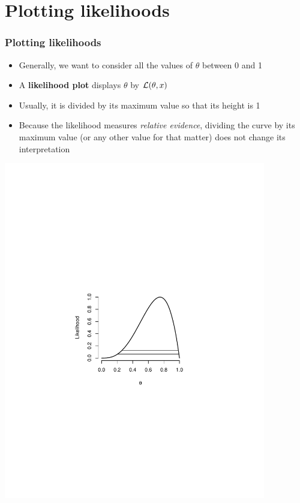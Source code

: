 \documentclass[aspectratio=169]{beamer}
\begin{document}
\section{Plotting likelihoods}
\begin{frame}\frametitle{Plotting likelihoods}
\begin{itemize}
\item Generally, we want to consider all the values of $\theta$ between 0 and 1
\item A {\bf likelihood plot} displays $\theta$ by ${\cal
    L}(\theta,x)$
\item Usually, it is divided by its maximum value so that its height
  is 1
\item Because the likelihood measures {\em relative evidence}, dividing the
  curve by its maximum value (or any other value for that matter) does
  not change its interpretation
\end{itemize}
\end{frame}

\begin{frame}
\includegraphics[width=4.5in]{coinLikelihood.pdf}
\end{frame}
\end{document}
